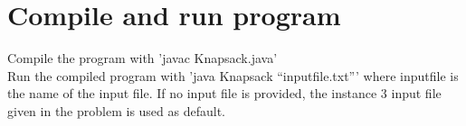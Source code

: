 \documentclass{inc/mas}
\begin{document}
\appendix
\section{Compile and run program}
\noindent Compile the program with 'javac Knapsack.java'\\ 
\noindent Run the compiled program with 'java Knapsack ``inputfile.txt''' where inputfile is the name of the input file. If no input file is provided, the instance 3 input file given in the problem is used as default. 


\end{document}
